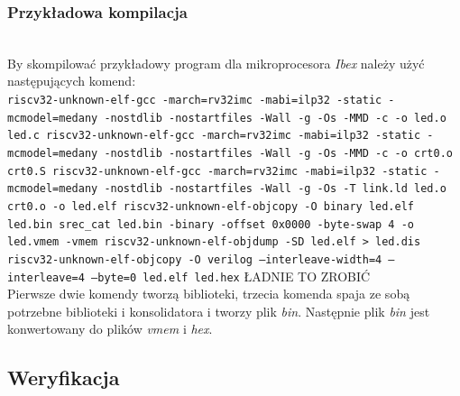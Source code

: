 \documentclass[11pt,a4paper]{article}
\def\code#1{\texttt{#1}}
\begin{document}
		\subsubsection{Przykładowa kompilacja}
		\hspace{5mm}
			\\By skompilować przykładowy program dla mikroprocesora 
			\textit{Ibex} należy użyć następujących komend: \\
\code{riscv32-unknown-elf-gcc -march=rv32imc -mabi=ilp32 -static -mcmodel=medany -nostdlib -nostartfiles -Wall -g -Os -MMD -c  -o led.o led.c
riscv32-unknown-elf-gcc -march=rv32imc -mabi=ilp32 -static -mcmodel=medany -nostdlib -nostartfiles -Wall -g -Os -MMD -c  -o crt0.o crt0.S
riscv32-unknown-elf-gcc -march=rv32imc -mabi=ilp32 -static -mcmodel=medany -nostdlib -nostartfiles -Wall -g -Os -T link.ld led.o crt0.o -o led.elf 
riscv32-unknown-elf-objcopy -O binary led.elf led.bin
srec\_cat led.bin -binary -offset 0x0000 -byte-swap 4 -o led.vmem -vmem
riscv32-unknown-elf-objdump -SD led.elf > led.dis
riscv32-unknown-elf-objcopy -O verilog --interleave-width=4 --interleave=4 --byte=0 led.elf led.hex} ŁADNIE TO ZROBIĆ\\
Pierwsze dwie komendy tworzą biblioteki, trzecia komenda spaja ze sobą potrzebne biblioteki i konsolidatora i tworzy plik \textit{bin}. Następnie plik \textit{bin} jest konwertowany do plików \textit{vmem} i \textit{hex}.
	\subsection{Weryfikacja}
\end{document}
